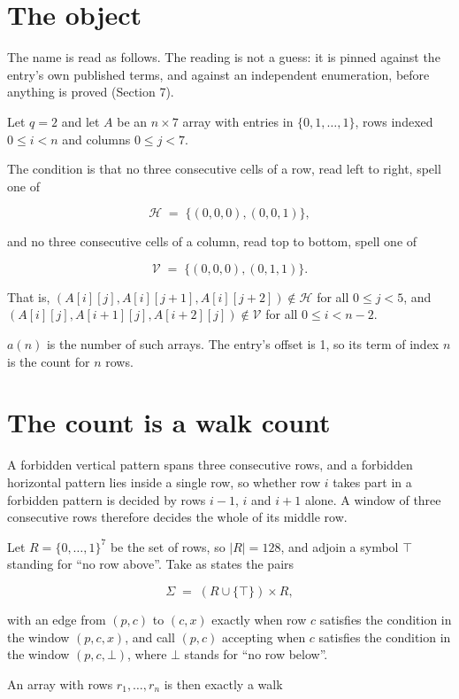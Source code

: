 \documentclass[11pt]{article}
\theoremstyle{definition}
\begin{document}
\section{The object}

The name is read as follows. The reading is not a guess: it is pinned against the entry's own published terms, and against an independent enumeration, before anything is proved (Section 7).

Let $q = 2$ and let $A$ be an $n \times 7$ array with entries in $\{0,1,\dots,1\}$, rows indexed $0 \le i < n$ and columns $0 \le j < 7$.

The condition is that no three consecutive cells of a row, read left to right, spell one of

\[\mathcal{H} \;=\; \{(0,0,0), (0,0,1)\},\]

and no three consecutive cells of a column, read top to bottom, spell one of

\[\mathcal{V} \;=\; \{(0,0,0), (0,1,1)\}.\]

That is, $(A[i][j],A[i][j{+}1],A[i][j{+}2]) \notin \mathcal{H}$ for all $0 \le j < 5$, and $(A[i][j],A[i{+}1][j],A[i{+}2][j]) \notin \mathcal{V}$ for all $0 \le i < n-2$.

$a(n)$ is the number of such arrays. The entry's offset is 1, so its term of index $n$ is the count for $n$ rows.

\section{The count is a walk count}

A forbidden vertical pattern spans three consecutive rows, and a forbidden horizontal pattern lies inside a single row, so whether row $i$ takes part in a forbidden pattern is decided by rows $i-1$, $i$ and $i+1$ alone. A window of three consecutive rows therefore decides the whole of its middle row.

Let $R = \{0,\dots,1\}^{7}$ be the set of rows, so $|R| = 128$, and adjoin a symbol $\top$ standing for ``no row above''. Take as states the pairs

\[\Sigma \;=\; (R \cup \{\top\}) \times R,\]

with an edge from $(p,c)$ to $(c,x)$ exactly when row $c$ satisfies the condition in the window $(p,c,x)$, and call $(p,c)$ accepting when $c$ satisfies the condition in the window $(p,c,\bot)$, where $\bot$ stands for ``no row below''.

An array with rows $r_1,\dots,r_n$ is then exactly a walk
\end{document}
